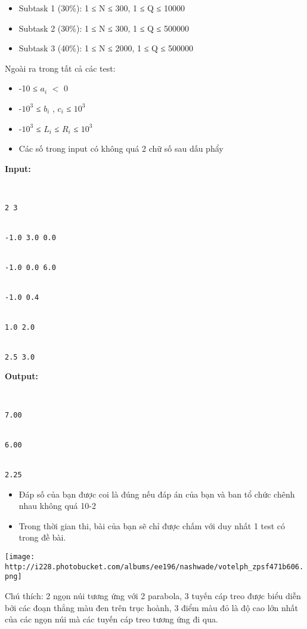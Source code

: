 \begin{itemize}
	\item     Subtask 1 (30\%): 1 ≤ N ≤ 300, 1 ≤ Q ≤ 10000   
	\item     Subtask 2 (30\%): 1 ≤ N ≤ 300, 1 ≤ Q ≤ 500000   
	\item     Subtask 3 (40\%): 1 ≤ N ≤ 2000, 1 ≤ Q ≤ 500000   
\end{itemize}

   Ngoài ra trong tất cả các test:  
\begin{itemize}
	\item     -10 ≤ $a_{i}$    $<$ 0   
	\item     -$10^{3}$    ≤ $b_{i}$    , $c_{i}$    ≤ $10^{3}$
	\item     -$10^{3}$    ≤ $L_{i}$    ≤ $R_{i}$    ≤ $10^{3}$
	\item     Các số trong input có không quá 2 chữ số sau dấu phẩy   
\end{itemize}
\textbf{    Input:   }
\begin{verbatim}


2 3


-1.0 3.0 0.0


-1.0 0.0 6.0


-1.0 0.4


1.0 2.0


2.5 3.0\end{verbatim}

\textbf{    Output:   }
\begin{verbatim}


7.00


6.00


2.25\end{verbatim}
\begin{itemize}
	\item     Đáp số của bạn được coi là đúng nếu đáp án của bạn và ban tổ chức chênh nhau không quá 10-2   
	\item     Trong thời gian thi, bài của bạn sẽ chỉ được chấm với duy nhất 1 test có trong đề bài.   
\end{itemize}
\texttt{[image: http://i228.photobucket.com/albums/ee196/nashwade/votelph\_zpsf471b606.png]}

Chú thích: 2 ngọn núi tương ứng với 2 parabola, 3 tuyến cáp treo được biểu diễn bởi các đoạn thẳng màu đen trên trục hoành, 3 điểm màu đỏ là độ cao lớn nhất của các ngọn núi mà các tuyến cáp treo tương ứng đi qua.